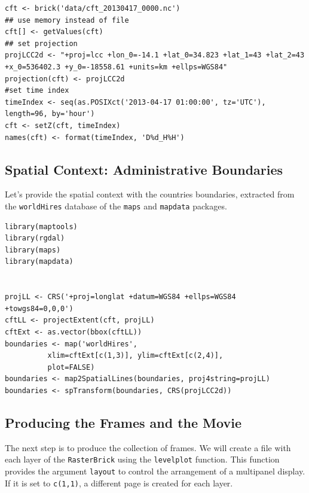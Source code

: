 \documentclass[smallroyalvopaper]{memoir}
\begin{document}
\lstset{language=R,numbers=none}
\begin{lstlisting}
cft <- brick('data/cft_20130417_0000.nc')
## use memory instead of file
cft[] <- getValues(cft)
## set projection
projLCC2d <- "+proj=lcc +lon_0=-14.1 +lat_0=34.823 +lat_1=43 +lat_2=43 +x_0=536402.3 +y_0=-18558.61 +units=km +ellps=WGS84"
projection(cft) <- projLCC2d
#set time index
timeIndex <- seq(as.POSIXct('2013-04-17 01:00:00', tz='UTC'), length=96, by='hour')
cft <- setZ(cft, timeIndex)
names(cft) <- format(timeIndex, 'D%d_H%H')
\end{lstlisting}

\subsection{Spatial Context: Administrative Boundaries}
\label{sec-5-2}
Let's provide the spatial context with the countries
boundaries, extracted from the \texttt{worldHires} database of the \texttt{maps}
and \texttt{mapdata} packages.


\lstset{language=R,numbers=none}
\begin{lstlisting}
library(maptools)
library(rgdal)
library(maps)
library(mapdata)


projLL <- CRS('+proj=longlat +datum=WGS84 +ellps=WGS84 +towgs84=0,0,0')
cftLL <- projectExtent(cft, projLL)
cftExt <- as.vector(bbox(cftLL))
boundaries <- map('worldHires',
		  xlim=cftExt[c(1,3)], ylim=cftExt[c(2,4)],
		  plot=FALSE)
boundaries <- map2SpatialLines(boundaries, proj4string=projLL)
boundaries <- spTransform(boundaries, CRS(projLCC2d))
\end{lstlisting}

\subsection{Producing the Frames and the Movie}
\label{sec-5-3}
The next step is to produce the collection of frames. We will create a
file with each layer of the \texttt{RasterBrick} using the \texttt{levelplot}
function. This function provides the argument \texttt{layout} to control the
arrangement of a multipanel display. If it is set to \texttt{c(1,1)}, a
different page is created for each layer.
\end{document}
